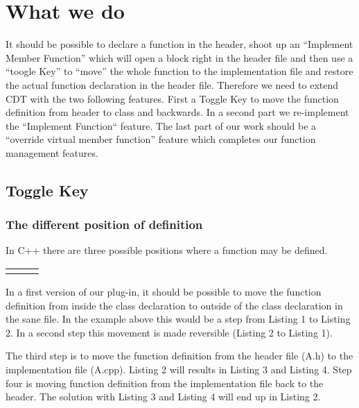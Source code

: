 \documentclass[a4paper,10pt]{scrreprt}
\begin{document}
\section{What we do}

It should be possible to declare a function in the header, shoot up an ``Implement Member Function'' which will open a block right in the header file and then use a ``toogle Key'' to ``move'' the whole function to the implementation file and restore the actual function declaration in the header file. Therefore we need to extend CDT with the two following features. First a Toggle Key to move the function definition from header to class and backwards. In a second part we re-implement the ``Implement Function`` feature. The last part of our work should be a ``override virtual member function'' feature which completes our function management features.

\subsection{Toggle Key}

\subsubsection{The different position of definition}

In C++ there are three possible positions where a function may be defined.




\begin{tabular}{p{5cm}p{.5cm}p{6cm}}

& &

\end{tabular}

In a first version of our plug-in, it should be possible to move the function definition from inside the class declaration to outside of the class declaration in the sane file. In the example above this would be a step from Listing 1 to Listing 2. In a second step this movement is made reversible (Listing 2 to Listing 1).

The third step is to move the function definition from the header file (A.h) to the implementation file (A.cpp). Listing 2 will results in Listing 3 and Listing 4. Step four is moving function definition from the implementation file back to the header. The solution with Listing 3 and Listing 4 will end up in Listing 2.
\end{document}

